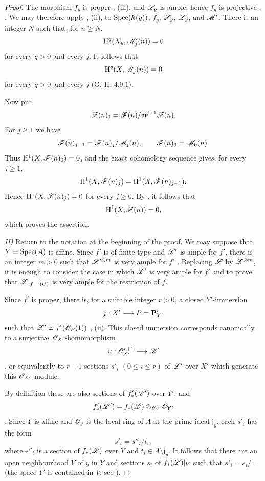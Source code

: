 \begin{proof}
The morphism $f_y$ is proper , (iii), and
$\mathscr{L}_y$ is ample; hence $f_y$ is projective
, .  We may therefore apply
, (ii), to
$\operatorname{Spec}(\boldsymbol{k}(y))$, $f_y$, $\mathscr{S}_y$, $\mathscr{L}_y$, and $\mathscr{M}'$.
There is an integer $N$ such that, for $n\geq N$,
\[
  \mathrm{H}^q(X_y,\mathscr{M}'_j(n))=0
\]
for every $q>0$ and every $j$.  It follows that
\[
  \mathrm{H}^q(X,\mathscr{M}_j(n))=0
\]
for every $q>0$ and every $j$ (G, II, 4.9.1).

Now put
\[
  \mathscr{F}(n)_j
  =
  \mathscr{F}(n)/\mathfrak m^{j+1}\mathscr{F}(n).
\]
For $j\geq1$ we have
\[
  \mathscr{F}(n)_{j-1}
  =
  \mathscr{F}(n)_j/\mathscr{M}_j(n),
  \qquad
  \mathscr{F}(n)_0=\mathscr{M}_0(n).
\]
Thus $\mathrm{H}^1(X,\mathscr{F}(n)_0)=0$, and the exact cohomology sequence
gives, for every $j\geq1$,
\[
  \mathrm{H}^1(X,\mathscr{F}(n)_j)
  =
  \mathrm{H}^1(X,\mathscr{F}(n)_{j-1}).
\]
Hence $\mathrm{H}^1(X,\mathscr{F}(n)_j)=0$ for every $j\geq0$.  By
, it follows that
\[
  \mathrm{H}^1(X,\mathscr{F}(n))=0,
\]
which proves the assertion.


\noindent\textit{II)} Return to the notation at the beginning of
the proof.  We may suppose that $Y=\operatorname{Spec}(A)$ is affine.  Since
$f'$ is of finite type and $\mathscr{L}'$ is ample for $f'$, there is an
integer $m>0$ such that $\mathscr{L}'^{\otimes m}$ is very ample for
$f'$ .  Replacing $\mathscr{L}$ by
$\mathscr{L}^{\otimes m}$, it is enough to consider the case in which
$\mathscr{L}'$ is very ample for $f'$ and to prove that
$\mathscr{L}|_{f^{-1}(U)}$ is very ample for the restriction of $f$.

Since $f'$ is proper, there is, for a suitable integer $r>0$, a
closed $Y'$-immersion
\[
  j:X'\longrightarrow P=\mathbf{P}_{Y'}^r
\]
such that $\mathscr{L}'\simeq j^*(\mathscr{O}_P(1))$
, (ii).  This closed immersion corresponds
canonically to a surjective $\mathscr{O}_{X'}$-homomorphism
\[
  u:\mathscr{O}_{X'}^{r+1}\longrightarrow\mathscr{L}'
\]
, or equivalently  to
$r+1$ sections $s'_i$ $(0\leq i\leq r)$ of $\mathscr{L}'$ over $X'$
which generate this $\mathscr{O}_{X'}$-module.

By definition these are also sections of $f'_*(\mathscr{L}')$ over
$Y'$, and
\[
  f'_*(\mathscr{L}')
  =
  f_*(\mathscr{L})\otimes_{\mathscr{O}_Y}\mathscr{O}_{Y'}
\]
.  Since $Y$ is affine and $\mathscr{O}_y$ is the
local ring of $A$ at the prime ideal $\mathfrak j_y$, each $s'_i$
has the form
\[
  s'_i=s''_i/t_i,
\]
where $s''_i$ is a section of $f_*(\mathscr{L})$ over $Y$ and
$t_i\in A\setminus\mathfrak j_y$.  It follows that there are an
open neighbourhood $V$ of $y$ in $Y$ and sections $s_i$ of
$f_*(\mathscr{L})|_V$ such that $s'_i=s_i/1$ (the space $Y'$ is
contained in $V$; see ).


\end{proof}
